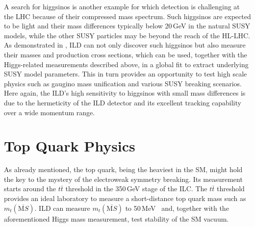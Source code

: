 A search for higgsinos is another example for which detection is challenging at the LHC because of their compressed mass spectrum. Such higgsinos are expected to be light and their mass differences typically below 20\,GeV in the natural SUSY models, while the other SUSY particles may be beyond the reach of the HL-LHC. As demonstrated in \cite{Baer:2016new}, ILD can not only discover such higgsinos but also measure their masses and production cross sections, which can be used, together with the Higgs-related measurements described above, in a global fit to extract underlying SUSY model parameters. This in turn provides an opportunity to test high scale physics such as gaugino mass unification and various SUSY breaking scenarios. Here again, the ILD's high sensitivity to higgsinos with small mass differences is due to the hermeticity of the ILD detector and its excellent tracking capability over a wide momentum range.


\section{Top Quark Physics}
As already mentioned, the top quark, being the heaviest in the SM, might hold the key to the mystery of the electroweak symmetry breaking. Its measurement starts around the $t\bar{t}$ threshold in the 350\,GeV stage of the ILC. The $t\bar{t}$ threshold provides an ideal laboratory to measure a short-distance top quark mass such as $m_t(\overline{\mathrm MS})$. ILD can measure $m_t(\overline{\mathrm MS})$ to 50\,MeV~\cite{Horiguchi:2013wra, Vos:2016til} and, together with the aforementioned Higgs mass measurement, test stability of the SM vacuum. 

